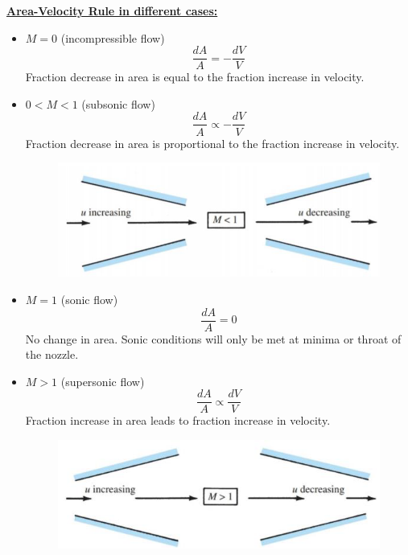 \Large \textbf{\underline{\color{red}Area-Velocity Rule in different cases:\color{black}}}
\vspace{3mm}
\begin{itemize}
    \item $M=0$ (\color{blue}incompressible flow\color{black})
    \begin{equation*}
        \frac{dA}{A} = - \frac{dV}{V}
    \end{equation*}
    Fraction {\color{blue} decrease in area } is {\color{blue} equal} to the fraction {\color{blue} increase in velocity}.
    \item $0< M < 1$ ({\color{blue}subsonic flow})
    \begin{equation*}
        \frac{dA}{A} \propto - \frac{dV}{V}
    \end{equation*}
    Fraction {\color{blue} decrease in area } is {\color{blue} proportional} to the fraction {\color{blue} increase in velocity}.
    \begin{figure}[H]
        \centering
        \includegraphics[width=1.0\linewidth]{images/area_velocity_subsonic_flow.png}
    \end{figure}
    \item $M=1$ ({\color{blue}sonic flow})
    \begin{equation*}
        \frac{dA}{A} = 0
    \end{equation*}
    No change in area. Sonic conditions will only be met at {\color{blue}minima or throat} of the nozzle.
    \item $M>1$ ({\color{blue}supersonic flow})
    \begin{equation*}
        \frac{dA}{A} \propto \frac{dV}{V}
    \end{equation*}
    Fraction {\color{blue} increase in area } leads to fraction {\color{blue} increase in velocity}.
    \begin{figure}[H]
        \centering
        \includegraphics[width=1.0\linewidth]{images/area_velocity_supersonic_flow.png}
    \end{figure}
\end{itemize}

